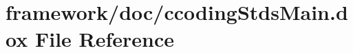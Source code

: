\hypertarget{ccoding_stds_main_8dox}{}\section{framework/doc/ccoding\+Stds\+Main.dox File Reference}
\label{ccoding_stds_main_8dox}
